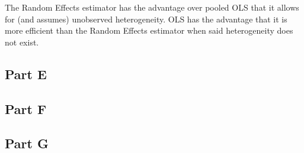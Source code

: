 \documentclass[letterpaper, 12pt]{article}
\begin{document}
The Random Effects estimator has the advantage over pooled OLS that it allows for (and assumes) unobserved heterogeneity. OLS has the advantage that it is more efficient than the Random Effects estimator when said heterogeneity does not exist.

\subsection{Part E}

\subsection{Part F}



\subsection{Part G}
\end{document}
